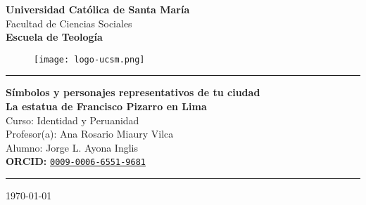 \begin{titlepage}
	
	\begin{center}
		\huge \textbf{Universidad Católica de Santa María}\\[1cm]
		
		\large Facultad de Ciencias Sociales\\[3mm]
		\textbf{Escuela de Teología}\\[3mm]
		
		\begin{figure}[h]
			\centering
			\texttt{[image: logo-ucsm.png]} %
		\end{figure}		
		\vspace{3mm}
		
		\textcolor{verdelimon} {\rule{\linewidth}{0.5mm}}	
		
		\vspace{4mm}
		{\Large\textbf{Símbolos y personajes representativos de tu ciudad}}\\[3mm]
		{\LARGE\textbf{La estatua de Francisco Pizarro en Lima}}\\[5mm]
		
		\large{Curso: Identidad y Peruanidad}\\[2mm]
		\large{Profesor(a): Ana Rosario Miaury Vilca}\\[2mm]
		\large{Alumno: Jorge L. Ayona Inglis}\\[2mm]
		
		\large{\textbf{ORCID:} \href{https://orcid.org/0009-0006-6551-9681}{\texttt{0009-0006-6551-9681}}}\\[3mm]
		
		\textcolor{verdelimon}{\rule{\linewidth}{0.5mm}}	
		\vspace{0.5cm}
		
		{\large \today}
		
	\end{center}
	
\end{titlepage}
